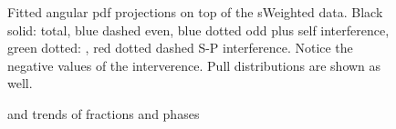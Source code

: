 \begin{figure}[h]
\begin{center}
  \begin{subfigure}{0.5\textwidth}
    \scalebox{1.3}{}
    \caption{}
    \label{angPlot_ctk}
  \end{subfigure}%
  \hfill%
  \begin{subfigure}{0.5\textwidth}
    \scalebox{1.3}{}
    \caption{}
    \label{angPlot_ctl}
  \end{subfigure}
  \begin{subfigure}{0.5\textwidth}
    \scalebox{1.3}{}
    \caption{}
    \label{angPlot_phi}
  \end{subfigure}
  \caption{Fitted angular pdf projections on top of the \BsJpsiKst sWeighted data. 
           Black solid: total, blue dashed \pwave even, blue dotted \pwave odd plus \pwave self interference, 
           green dotted: \swave, red dotted dashed S-P interference. Notice the negative values of the \spwave interverence.
           Pull distributions are shown as well.}
  \label{angular_plot}
\end{center}
\end{figure}

\begin{figure}[h]
  \centering
  \begin{subfigure}{0.5\textwidth}
    \scalebox{0.60}{}
    \caption{}
    \label{skase}
  \end{subfigure}%
  \hfill%
  \begin{subfigure}{0.5\textwidth}
    \scalebox{0.60}{}
    \caption{}
    \label{opasd}
  \end{subfigure}
  \begin{subfigure}{0.5\textwidth}
    \scalebox{0.60}{}
    \caption{}
    \label{opa}
  \end{subfigure}%
\caption{\pwave and \swave trends of \BsJpsiKst \BdJpsiKst fractions and phases}
\end{figure}

